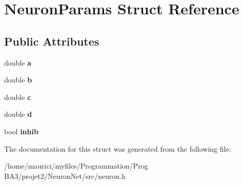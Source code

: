 \hypertarget{structNeuronParams}{}\section{Neuron\+Params Struct Reference}
\label{structNeuronParams}
\subsection*{Public Attributes}
\begin{DoxyCompactItemize}
\item 
\mbox{\label{structNeuronParams_a359703733f5e70bbd67d019e45a3bc85}} 
double {\bfseries a}
\item 
\mbox{\label{structNeuronParams_abd1bd37179d8efa115a8749f9252f77d}} 
double {\bfseries b}
\item 
\mbox{\label{structNeuronParams_a5df2ced2526eb84af2c8d2d34d9bfd93}} 
double {\bfseries c}
\item 
\mbox{\label{structNeuronParams_af2bd3bad3bc5532186cdc8d056a10cfb}} 
double {\bfseries d}
\item 
\mbox{\label{structNeuronParams_a751856d77a821cbd361b774d8653bbe6}} 
bool {\bfseries inhib}
\end{DoxyCompactItemize}


The documentation for this struct was generated from the following file\+:\begin{DoxyCompactItemize}
\item 
/home/maurici/myfiles/\+Programmation/\+Prog B\+A3/projet2/\+Neuron\+Net/src/neuron.\+h\end{DoxyCompactItemize}
